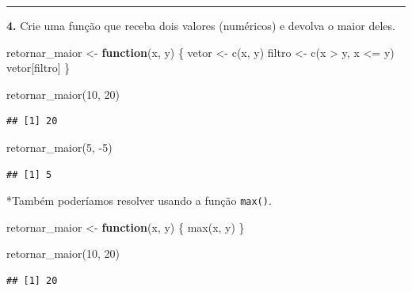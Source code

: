 \documentclass[
]{book}
\newenvironment{Shaded}{\begin{snugshade}}{\end{snugshade}}
\newcommand{\ControlFlowTok}[1]{\textcolor[rgb]{0.13,0.29,0.53}{\textbf{#1}}}
\newcommand{\DecValTok}[1]{\textcolor[rgb]{0.00,0.00,0.81}{#1}}
\newcommand{\FunctionTok}[1]{\textcolor[rgb]{0.00,0.00,0.00}{#1}}
\newcommand{\NormalTok}[1]{#1}
\newcommand{\OtherTok}[1]{\textcolor[rgb]{0.56,0.35,0.01}{#1}}
\newcommand{\SpecialCharTok}[1]{\textcolor[rgb]{0.00,0.00,0.00}{#1}}
\begin{document}
\begin{center}\rule{0.5\linewidth}{0.5pt}\end{center}

\textbf{4.} Crie uma função que receba dois valores (numéricos) e devolva o maior deles.

\begin{Shaded}
\begin{Highlighting}[]
\NormalTok{retornar\_maior }\OtherTok{\textless{}{-}} \ControlFlowTok{function}\NormalTok{(x, y) \{}
\NormalTok{  vetor }\OtherTok{\textless{}{-}} \FunctionTok{c}\NormalTok{(x, y)}
\NormalTok{  filtro }\OtherTok{\textless{}{-}} \FunctionTok{c}\NormalTok{(x }\SpecialCharTok{\textgreater{}}\NormalTok{ y, x }\SpecialCharTok{\textless{}=}\NormalTok{ y)}
\NormalTok{  vetor[filtro]}
\NormalTok{\}}

\FunctionTok{retornar\_maior}\NormalTok{(}\DecValTok{10}\NormalTok{, }\DecValTok{20}\NormalTok{)}
\end{Highlighting}
\end{Shaded}

\begin{verbatim}
## [1] 20
\end{verbatim}

\begin{Shaded}
\begin{Highlighting}[]
\FunctionTok{retornar\_maior}\NormalTok{(}\DecValTok{5}\NormalTok{, }\SpecialCharTok{{-}}\DecValTok{5}\NormalTok{)}
\end{Highlighting}
\end{Shaded}

\begin{verbatim}
## [1] 5
\end{verbatim}

*Também poderíamos resolver usando a função \texttt{max()}.

\begin{Shaded}
\begin{Highlighting}[]
\NormalTok{retornar\_maior }\OtherTok{\textless{}{-}} \ControlFlowTok{function}\NormalTok{(x, y) \{}
  \FunctionTok{max}\NormalTok{(x, y)}
\NormalTok{\}}

\FunctionTok{retornar\_maior}\NormalTok{(}\DecValTok{10}\NormalTok{, }\DecValTok{20}\NormalTok{)}
\end{Highlighting}
\end{Shaded}

\begin{verbatim}
## [1] 20
\end{verbatim}
\end{document}
